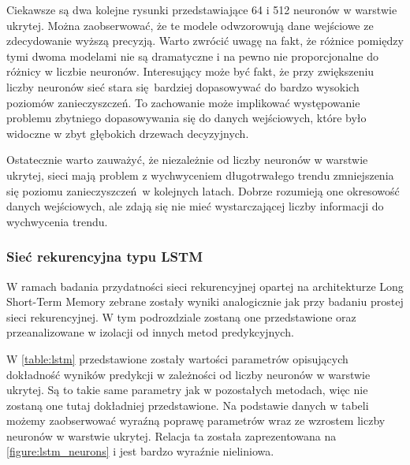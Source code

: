 \documentclass[10pt,a4paper]{article}
\begin{document}
Ciekawsze są dwa kolejne rysunki przedstawiające 64 i 512 neuronów w warstwie ukrytej. Można zaobserwować, że te modele odwzorowują dane wejściowe ze zdecydowanie wyższą precyzją. Warto zwrócić uwagę na fakt, że różnice pomiędzy tymi dwoma modelami nie są dramatyczne i na pewno nie proporcjonalne do różnicy w liczbie neuronów. Interesujący może być fakt, że przy zwiększeniu liczby neuronów sieć stara się bardziej dopasowywać do bardzo wysokich poziomów zanieczyszczeń. To zachowanie może implikować występowanie problemu zbytniego dopasowywania się do danych wejściowych, które było widoczne w zbyt głębokich drzewach decyzyjnych.

Ostatecznie warto zauważyć, że niezależnie od liczby neuronów w warstwie ukrytej, sieci mają problem z wychwyceniem długotrwałego trendu zmniejszenia się poziomu zanieczyszczeń w kolejnych latach. Dobrze rozumieją one okresowość danych wejściowych, ale zdają się nie mieć wystarczającej liczby informacji do wychwycenia trendu. 
\newpage
\subsubsection{Sieć rekurencyjna typu LSTM}
W ramach badania przydatności sieci rekurencyjnej opartej na architekturze Long Short-Term Memory zebrane zostały wyniki analogicznie jak przy badaniu prostej sieci rekurencyjnej. W tym podrozdziale zostaną one przedstawione oraz przeanalizowane w izolacji od innych metod predykcyjnych. 

W \autoref{table:lstm} przedstawione zostały wartości parametrów opisujących dokładność wyników predykcji w zależności od liczby neuronów w warstwie ukrytej. Są to takie same parametry jak w pozostałych metodach, więc nie zostaną one tutaj dokładniej przedstawione. Na podstawie danych w tabeli możemy zaobserwować wyraźną poprawę parametrów wraz ze wzrostem liczby neuronów w warstwie ukrytej. Relacja ta została zaprezentowana na \autoref{figure:lstm_neurons} i jest bardzo wyraźnie nieliniowa. 
\end{document}
